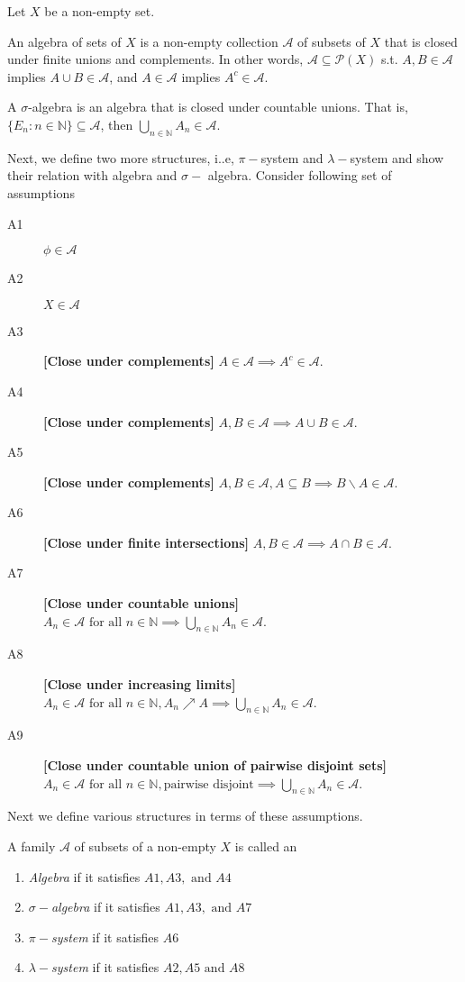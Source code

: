 \documentclass[a4paper,english,12pt]{article}   	%
\begin{document}
Let $X$ be a non-empty set.
\begin{defn}[Algebra] An algebra of sets of $X$ is a non-empty collection $\mathcal{A}$ of subsets of $X$ that is closed under finite unions and complements. In other words, $\mathcal{A}\subseteq \mathcal{P}(X)$ s.t. $A,B \in \mathcal{A}$ implies $A\cup B \in \mathcal{A}$, and $A \in \mathcal{A}$ implies $A^c \in \mathcal{A}$.
\end{defn}
\begin{defn} A $\sigma$-algebra is an algebra that is closed under countable unions. That is, $\{E_n:n\in \mathds{N} \}\subseteq \mathcal{A}$, then $\bigcup_{n\in \mathds{N}}A_n\in \mathcal{A}$.
\end{defn}
Next, we define two more structures, i..e, $\pi-$system and $\lambda-$system and show their relation with algebra and $\sigma-$ algebra. Consider following set of assumptions
\begin{description}
  \item[A1] $\phi\in\mathcal{A}$
  \item[A2] $X\in\mathcal{A}$
  \item[A3] {\bf [Close under complements]} $A\in\mathcal{A} \implies A^c\in\mathcal{A}$.
  \item[A4] {\bf  [Close under complements]} $A,B\in\mathcal{A} \implies A\cup B\in\mathcal{A}$.
  \item[A5] {\bf [Close under complements]} $A,B\in\mathcal{A}, A\subseteq B \implies B\backslash A\in\mathcal{A}$.
  \item[A6] {\bf [Close under finite intersections]} $A,B\in\mathcal{A} \implies A\cap B\in\mathcal{A}$.
  \item[A7] {\bf [Close under countable unions]} $A_n\in\mathcal{A} \text{ for all } n\in \mathds{N}\implies \bigcup_{n\in \mathds{N}}A_n\in\mathcal{A}$.
  \item[A8] {\bf [Close under increasing limits]} $A_n\in\mathcal{A} \text{ for all } n\in \mathds{N}, A_n \nearrow A\implies \bigcup_{n\in \mathds{N}}A_n\in\mathcal{A}$.
  \item[A9] {\bf [Close under countable union of pairwise disjoint sets]} $A_n\in\mathcal{A} \text{ for all } n\in \mathds{N}, \text{pairwise disjoint}\implies \bigcup_{n\in \mathds{N}}A_n\in\mathcal{A}$.
\end{description}
 Next we define various structures in terms of these assumptions. 
 
\begin{defn}
 A family $\mathcal{A}$ of subsets of a non-empty $X$ is called an 
 \begin{enumerate}
   \item \emph{Algebra} if it satisfies $A1,A3,\text{ and } A4$
   \item $\sigma-$\emph{algebra} if it satisfies $A1,A3,\text{ and } A7$
   \item $\pi-$\emph{system} if it satisfies $A6$
   \item $\lambda-$\emph{system} if it satisfies $A2,A5\text{ and } A8$
 \end{enumerate}
 \end{defn}
\end{document}
